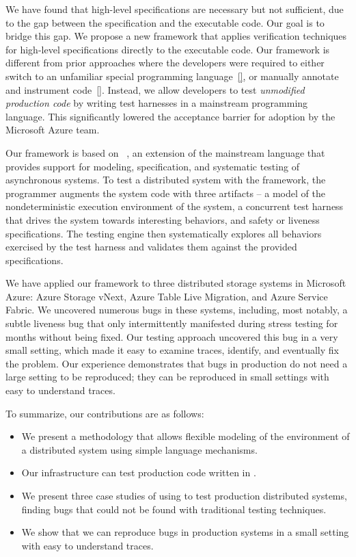 We have found that high-level specifications are necessary but not sufficient, due to the gap between the specification and the executable code.
Our goal is to bridge this gap. We propose a new framework that
applies verification techniques for high-level specifications directly
to the executable code. Our framework is different from prior
approaches where the developers were required to either switch to an
unfamiliar special programming language~\ref{}, or manually annotate
and instrument code~\ref{}. Instead, we allow developers to test
{\em unmodified production code} by writing test harnesses in a
mainstream programming language. This
significantly lowered the acceptance barrier for adoption by the
Microsoft Azure team.

Our framework is based on \psharp~\cite{deligiannis2015psharp}, an extension of the mainstream language \csharp that provides support for modeling, specification, and systematic testing of asynchronous systems.
To test a distributed system with the \psharp framework, the programmer augments the system code with three artifacts -- a model of the nondeterministic execution environment of the system, a concurrent test harness that drives the system towards interesting behaviors, and safety or liveness specifications.
The \psharp testing engine then systematically explores all behaviors exercised by the test harness and validates them against the provided specifications.

We have applied our framework to three distributed storage systems in Microsoft Azure: Azure Storage vNext, Azure Table Live Migration, 
and Azure Service Fabric.
We uncovered numerous bugs in these systems, including, most notably, a subtle liveness bug that only intermittently 
manifested during stress testing for months without being fixed.
Our testing approach uncovered this bug in a very small setting, which made it easy to examine traces, identify, and eventually fix the problem.
Our experience demonstrates that bugs in production do not need a large setting to be reproduced;
they can be reproduced in small settings with easy to understand traces.

To summarize, our contributions are as follows:
\begin{itemize}
\item We present a methodology that allows flexible modeling of the environment of a distributed system using simple language mechanisms.
\item Our infrastructure can test production code written in \csharp.
\item We present three case studies of using \psharp to test production distributed systems, finding bugs that could not be found with traditional testing techniques.
\item We show that we can reproduce bugs in production systems in a small setting with easy to understand traces.
\end{itemize}

